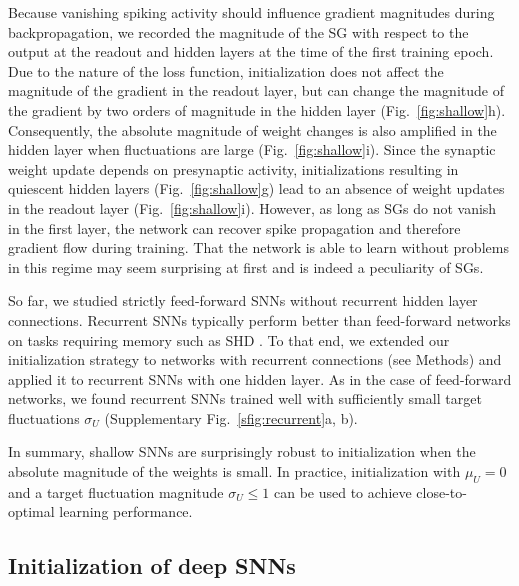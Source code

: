 \documentclass[11pt,a4paper]{article}
\begin{document}
Because vanishing spiking activity should influence gradient magnitudes during backpropagation, we recorded the
magnitude of the \ac{SG} with respect to the output at the readout
and hidden layers at the time of the first training epoch.
Due to the nature of the loss function, initialization does not affect the
magnitude of the gradient in the readout layer, but can change the magnitude
of the gradient by two orders of magnitude in the hidden layer
(Fig.~\ref{fig:shallow}h). 
Consequently, the absolute magnitude of weight changes is
also amplified in the hidden layer when fluctuations are large
(Fig.~\ref{fig:shallow}i). 
Since the synaptic weight update depends on presynaptic activity,
initializations resulting in quiescent hidden layers
(Fig.~\ref{fig:shallow}g) lead to an absence of weight
updates in the readout layer (Fig.~\ref{fig:shallow}i). 
However, as long as \acp{SG} do not vanish in the first layer,
the network can recover spike propagation and therefore gradient flow during
training.
That the network is able to learn without problems in this regime may seem
surprising at first and is indeed a peculiarity of \acp{SG}.


So far, we studied strictly feed-forward \acp{SNN} without recurrent hidden
layer connections.
Recurrent \acp{SNN} typically perform better than feed-forward networks on
tasks requiring memory such as \ac{SHD} \citep{Zenke2021-zg}.
To that end, we extended our initialization strategy to networks
with recurrent connections (see Methods) and applied it to recurrent \acp{SNN}
with one hidden layer.
As in the case of feed-forward networks, we found recurrent \acp{SNN} trained
well with sufficiently small target fluctuations $\sigma_U$ (Supplementary Fig.~\ref{sfig:recurrent}a, b). 

In summary, shallow \acp{SNN} are surprisingly robust to initialization when
the absolute magnitude of the weights is small. In practice, initialization
with $\mu_U=0$ and a target fluctuation magnitude $\sigma_U \leq 1$ can be used
to achieve close-to-optimal learning performance.

\subsection*{Initialization of deep \acp{SNN}}
\end{document}
